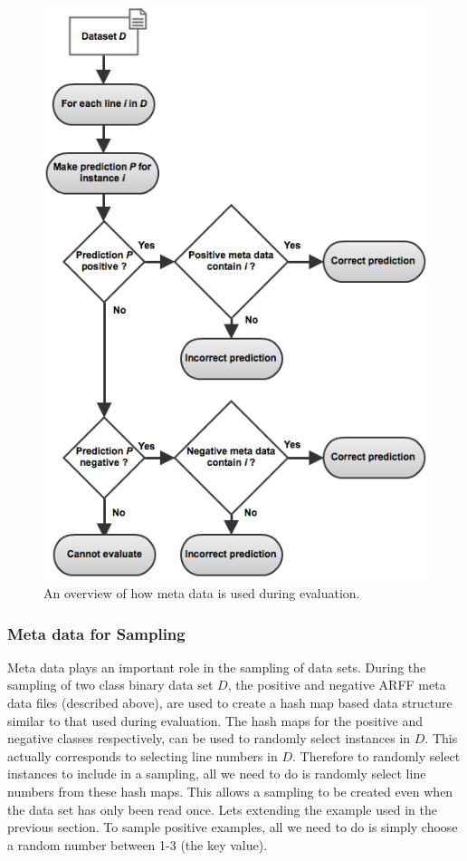 \documentclass[twoside,a4paper]{refart}
\begin{document}
\begin{figure}[!htbp]
\begin{center}
      \includegraphics[keepaspectratio,scale=0.464]{MetaDataEvalFlow.png}
    \fi
    \caption[An overview of how meta data is used during evaluation.]{An overview of how meta data is used during evaluation.}
    \label{metadata}
  \end{center}
\end{figure}
\newpage
\subsubsection{Meta data for Sampling}
Meta data plays an important role in the sampling of data sets. During the sampling of two class binary data set $D$, the positive and negative ARFF meta data files (described above), are used to create a hash map based data structure similar to that used during evaluation. The hash maps for the positive and negative classes respectively, can be used to randomly select instances in $D$. This actually corresponds to selecting line numbers in $D$. Therefore to randomly select instances to include in a sampling, all we need to do is randomly select line numbers from these hash maps. This allows a sampling to be created even when the data set has only been read once. Lets extending the example used in the previous section. To sample positive examples, all we need to do is simply choose a random number between 1-3 (the key value).
\end{document}
